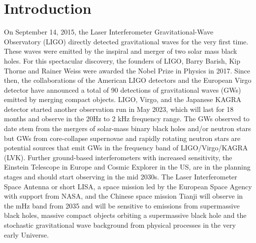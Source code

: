 \documentclass[%
 reprint,
 amsmath,amssymb,
 aps,
]{revtex4-2}
\begin{document}
\maketitle


\section{\label{sec:introduction} Introduction}
On September 14, 2015, the Laser Interferometer Gravitational-Wave Observatory (LIGO) directly detected gravitational waves for the very first time. These waves were emitted by the inspiral and merger of two solar mass black holes. For this spectacular discovery, the founders of LIGO, Barry Barish, Kip Thorne and Rainer Weiss were awarded the Nobel Prize in Physics in 2017.  Since then, the collaborations of the American LIGO detectors and the European Virgo detector have announced a total of 90 detections of gravitational waves (GWs) emitted by merging compact objects. LIGO, Virgo, and the Japanese KAGRA detector started another observation run in May 2023, which will last for 18 months and observe in the 20Hz to 2 kHz frequency range. The GWs observed to date stem from the mergers of solar-mass binary black holes and/or neutron stars but GWs from core-collapse supernovae and rapidly rotating neutron stars are potential sources that emit GWs in the frequency band of LIGO/Virgo/KAGRA (LVK).
Further ground-based interferometers with increased sensitivity, the Einstein Telescope in Europe and Cosmic Explorer in the US, are in the planning stages and should start observing in the mid 2030s. The Laser Interferometer Space Antenna or short LISA, a space mission led by the European Space Agency with support from NASA, and the Chinese space mission Tianji will observe in the mHz band from 2035 and will be sensitive to emissions from supermassive black holes, massive compact objects orbiting a supermassive black hole and the stochastic gravitational wave background from physical processes in the very early Universe.
\end{document}
